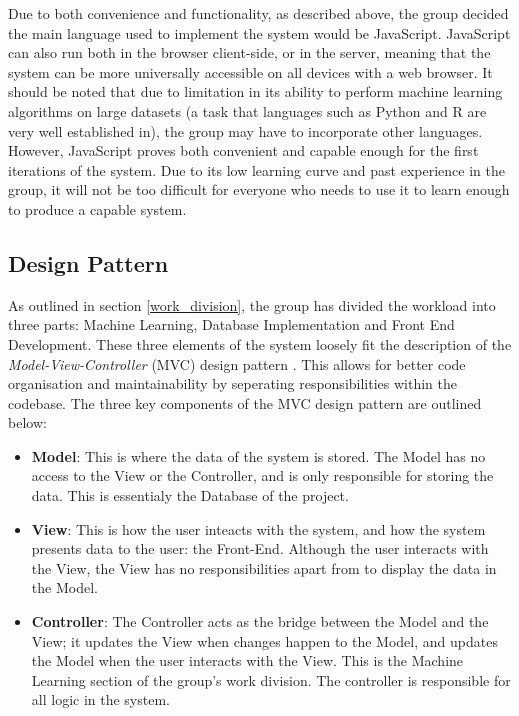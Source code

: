 \documentclass[a4paper,titlepage]{article}
\begin{document}
Due to both convenience and functionality, as described above, the group decided the main language used to implement the system would be JavaScript. 
JavaScript can also run both in the browser client-side, or in the server, meaning that the system can be more universally accessible on all devices with a web browser. 
It should be noted that due to limitation in its ability to perform machine learning algorithms on large datasets (a task that languages such as Python and R are very well established in), the group may have to incorporate other languages. 
However, JavaScript proves both convenient and capable enough for the first iterations of the system. 
Due to its low learning curve and past experience in the group, it will not be too difficult for everyone who needs to use it to learn enough to produce a capable system.

\subsection{Design Pattern}
As outlined in section \ref{work_division}, the group has divided the workload into three parts: Machine Learning, Database Implementation and Front End Development. 
These three elements of the system loosely fit the description of the \textit{Model-View-Controller} (MVC) design pattern \cite{google_mvc}. 
This allows for better code organisation and maintainability \cite{google_mvc} by seperating responsibilities within the codebase. 
The three key components of the MVC design pattern are outlined below:
\begin{itemize}
  \item \textbf{Model}: 
  This is where the data of the system is stored.
  The Model has no access to the View or the Controller, and is only responsible for storing the data.
  This is essentialy the Database of the project.
  \item \textbf{View}:
  This is how the user inteacts with the system, and how the system presents data to the user: the Front-End.
  Although the user interacts with the View, the View has no responsibilities apart from to display the data in the Model.
  \item \textbf{Controller}:
  The Controller acts as the bridge between the Model and the View; it updates the View when changes happen to the Model, and updates the Model when the user interacts with the View.
  This is the Machine Learning section of the group's work division.
  The controller is responsible for all logic in the system.
\end{itemize}
\end{document}
